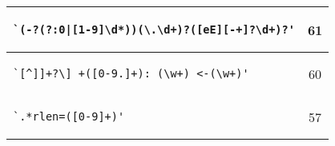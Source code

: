 \begin{table}
\begin{center}
\begin{small}
\begin{tabular}{lc}
\begin{minipage}{2.4in}
\begin{verbatim}
`(-?(?:0|[1-9]\d*))(\.\d+)?([eE][-+]?\d+)?'\end{verbatim}
\end{minipage}
& 61 \\ 
\midrule
\begin{minipage}{2.4in}
\begin{verbatim}
`[^]]+?\] +([0-9.]+): (\w+) <-(\w+)'\end{verbatim}
\end{minipage}
& 60 \\ 
\midrule
\begin{minipage}{2.4in}
\begin{verbatim}
`.*rlen=([0-9]+)'\end{verbatim}
\end{minipage}
& 57 \\ 
\bottomrule
\end{tabular}
\end{small}
\end{center}
\end{table}
